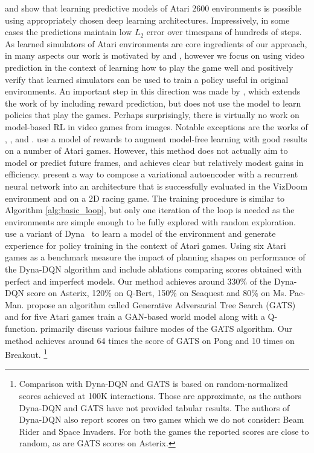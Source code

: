 \citet{video_prediction} and \citet{recurrent} show that learning predictive models of Atari 2600 environments is possible using appropriately chosen deep learning architectures. Impressively, in some cases the predictions maintain low $L_2$ error over timespans of hundreds of steps. 
As learned simulators of Atari environments are core ingredients of our approach, in many aspects our work is motivated by \citet{video_prediction} and \citet{recurrent}, however we focus on using video prediction in the context of learning how to play the game well and positively verify that learned simulators can be used to train a policy useful in original environments.
An important step in this direction was made by \citet{video_reward_prediction}, which extends the work of \citet{video_prediction} by including reward prediction, but does not use the model to learn policies that play the games.
Perhaps surprisingly, there is virtually no work on model-based RL in video games from images.
Notable exceptions are the works of
\citet{vpn}, \citet{world_models}, \citet{dyna_dqn} and \citet{gats}. \citet{vpn} use a model of rewards to augment model-free learning with good results on a number of Atari games. However, this method does not actually aim to model or predict future frames, and achieves clear but relatively modest gains in efficiency.
\citet{world_models} present a way to compose a variational autoencoder with a recurrent neural network into an architecture  
that is successfully evaluated in the VizDoom environment and on a 2D racing game. 
The training procedure is similar to  Algorithm \ref{alg:basic_loop}, but only one iteration of the loop is needed as the environments are simple enough to be fully explored with random exploration. \citet{dyna_dqn} use a variant of Dyna~\cite{dyna} to learn a model of the environment and generate experience for policy training in the context of Atari games. Using six Atari games as a benchmark \citet{dyna_dqn} measure the impact of planning shapes on performance of the Dyna-DQN algorithm and include ablations comparing scores obtained with perfect and imperfect models. Our method achieves around 330\% of the Dyna-DQN score on Asterix, 120\% on Q-Bert, 150\% on Seaquest and 80\% on Ms. Pac-Man. \cite{gats} propose an algorithm called Generative Adversarial Tree Search (GATS) and for five Atari games train a GAN-based world model along with a Q-function. \cite{gats} primarily discuss various failure modes of the GATS algorithm. Our method achieves around 64 times the score of GATS on Pong and 10 times on Breakout. \footnote{Comparison with Dyna-DQN and GATS is based on  random-normalized scores achieved at 100K interactions. Those are approximate, as the authors Dyna-DQN and GATS have not provided tabular results. The authors of Dyna-DQN also report scores on two games which we do not consider: Beam Rider and Space Invaders. For both the games the reported scores are close to random, as are GATS scores on Asterix.}

